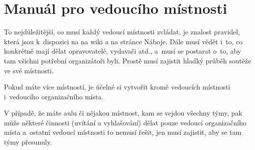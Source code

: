 \documentclass[vyfuk,\classoptions]{fksempty}
\begin{document}
\section{Manuál pro vedoucího místnosti}

To nejdůležitější, co musí každý vedoucí místnosti zvládat, 
je znalost pravidel, která jsou k~dispozici 
na na wiki a na stránce Náboje.
Dále musí vědět i~to, co konkrétně mají dělat opravovatelé, vydavači atd., a~musí se postarat 
o~to, aby tam všichni potřební organizátoři byli. 
Prostě musí zajistit hladký průběh soutěže ve své místnosti.

\bigskip

Pokud máte více místností, je účelné si vytvořit kromě vedoucích místnosti 
i~vedoucího organizačního místa. 

V případě, že máte aulu či nějakou místnost,
kam se vejdou všechny týmy, pak může některé činnosti (uvítání a vyhlašování)
dělat pouze vedoucí organizačního místa a~ostatní vedoucí místnosti to nemusí řešit, 
jen musí zajistit, aby se tam týmy přesunuly.

\bigskip
\end{document}
